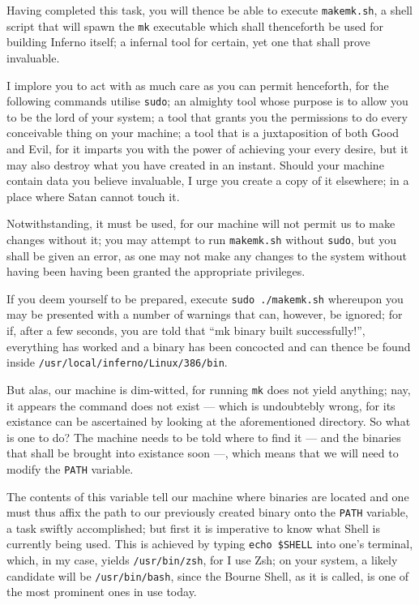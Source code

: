 \documentclass[a4paper,12pt]{report}
\begin{document}
  Having completed this task, you will thence be able to execute \texttt{makemk.sh}, a shell script that will spawn the \texttt{mk} executable which shall thenceforth be used for building Inferno itself; a infernal tool for certain, yet one that shall prove invaluable.

  I implore you to act with as much care as you can permit henceforth, for the following commands utilise \texttt{sudo}; an almighty tool whose purpose is to allow you to be the lord of your system; a tool that grants you the permissions to do every conceivable thing on your machine; a tool that is a juxtaposition of both Good and Evil, for it imparts you with the power of achieving your every desire, but it may also destroy what you have created in an instant. Should your machine contain data you believe invaluable, I urge you create a copy of it elsewhere; in a place where Satan cannot touch it.

  Notwithstanding, it must be used, for our machine will not permit us to make changes without it; you may attempt to run \texttt{makemk.sh} without \texttt{sudo}, but you shall be given an error, as one may not make any changes to the system without having been having been granted the appropriate privileges.

  If you deem yourself to be prepared, execute \texttt{sudo ./makemk.sh} whereupon you may be presented with a number of warnings that can, however, be ignored; for if, after a few seconds, you are told that ``mk binary built successfully!'', everything has worked and a binary has been concocted and can thence be found inside \texttt{/usr/local/inferno/Linux/386/bin}.

  But alas, our machine is dim-witted, for running \texttt{mk} does not yield anything; nay, it appears the command does not exist — which is undoubtebly wrong, for its existance can be ascertained by looking at the aforementioned directory. So what is one to do? The machine needs to be told where to find it — and the binaries that shall be brought into existance soon —, which means that we will need to modify the \texttt{PATH} variable.

  The contents of this variable tell our machine where binaries are located and one must thus affix the path to our previously created binary onto the \texttt{PATH} variable, a task swiftly accomplished; but first it is imperative to know what Shell is currently being used. This is achieved by typing \texttt{echo \$SHELL} into one's terminal, which, in my case, yields \texttt{/usr/bin/zsh}, for I use Zsh; on your system, a likely candidate will be \texttt{/usr/bin/bash}, since the Bourne Shell, as it is called, is one of the most prominent ones in use today.
\end{document}
